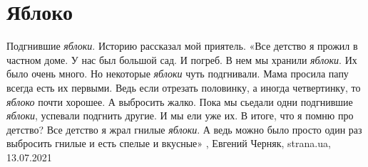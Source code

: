  
 
 
 
 
\chapter{Яблоко}

Подгнившие \emph{яблоки}.  Историю рассказал мой приятель.  «Все детство я прожил в
частном доме.  У нас был большой сад. И погреб.  В нем мы хранили \emph{яблоки}. Их
было очень много. Но некоторые \emph{яблоки} чуть подгнивали.  Мама просила папу
всегда есть их первыми.  Ведь если отрезать половинку, а иногда четвертинку, то
\emph{яблоко} почти хорошее. А выбросить жалко.  Пока мы сьедали одни подгнившие
\emph{яблоки}, успевали подгнить другие. И мы ели уже их.  В итоге, что я помню про
детство?  Все детство я жрал гнилые \emph{яблоки}.  А ведь можно было просто один раз
выбросить гнилые и есть спелые и вкусные»
, 
Евгений Черняк, strana.ua, 13.07.2021
